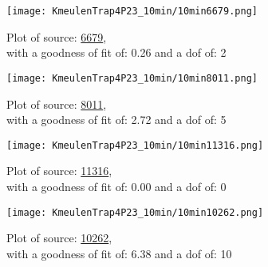 \documentclass{article}
\begin{document}
\begin{figure}[H]
    \centering
    \begin{minipage}{.5\textwidth}
        \centering
        \texttt{[image: KmeulenTrap4P23\_10min/10min6679.png]}
        \captionsetup{labelformat=empty}
        \caption{Plot of source: \href{http://banana.transientskp.org/r4/vlo_KmeulenTrap4P23/runningcatalog/6679}{6679},\\with a goodness of fit of: 0.26 and a dof of: 2}
        \addtocounter{figure}{-1}
        \label{KmeulenTrap4P23:10min:6679:plot}
    \end{minipage}%
    \begin{minipage}{0.5\textwidth}
        \centering

        \texttt{[image: KmeulenTrap4P23\_10min/10min8011.png]}
        \captionsetup{labelformat=empty}
        \caption{Plot of source: \href{http://banana.transientskp.org/r4/vlo_KmeulenTrap4P23/runningcatalog/8011}{8011},\\with a goodness of fit of: 2.72 and a dof of: 5}
    \addtocounter{figure}{-1}
    \label{KmeulenTrap4P23:10min:8011:plot}
    \end{minipage}
\end{figure}
\begin{figure}[H]
    \centering
    \begin{minipage}{.5\textwidth}
        \centering
        \texttt{[image: KmeulenTrap4P23\_10min/10min11316.png]}
        \captionsetup{labelformat=empty}
        \caption{Plot of source: \href{http://banana.transientskp.org/r4/vlo_KmeulenTrap4P23/runningcatalog/11316}{11316},\\with a goodness of fit of: 0.00 and a dof of: 0}
        \addtocounter{figure}{-1}
        \label{KmeulenTrap4P23:10min:11316:plot}
    \end{minipage}%
    \begin{minipage}{0.5\textwidth}
        \centering

        \texttt{[image: KmeulenTrap4P23\_10min/10min10262.png]}
        \captionsetup{labelformat=empty}
        \caption{Plot of source: \href{http://banana.transientskp.org/r4/vlo_KmeulenTrap4P23/runningcatalog/10262}{10262},\\with a goodness of fit of: 6.38 and a dof of: 10}
    \addtocounter{figure}{-1}
    \label{KmeulenTrap4P23:10min:10262:plot}
    \end{minipage}
\end{figure}
\end{document}
